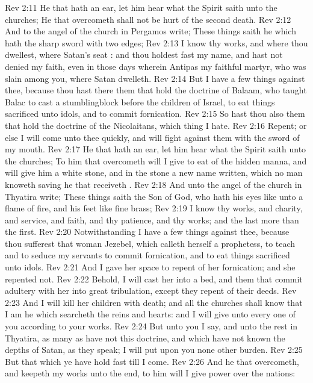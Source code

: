 \vs Rev 2:11 He that hath an ear, let him hear what the Spirit saith unto the churches; He that overcometh shall not be hurt of the second death.
\vs Rev 2:12 And to the angel of the church in Pergamos write; These things saith he which hath the sharp sword with two edges;
\vs Rev 2:13 I know thy works, and where thou dwellest,  where Satan's seat : and thou holdest fast my name, and hast not denied my faith, even in those days wherein Antipas  my faithful martyr, who was slain among you, where Satan dwelleth.
\vs Rev 2:14 But I have a few things against thee, because thou hast there them that hold the doctrine of Balaam, who taught Balac to cast a stumblingblock before the children of Israel, to eat things sacrificed unto idols, and to commit fornication.
\vs Rev 2:15 So hast thou also them that hold the doctrine of the Nicolaitans, which thing I hate.
\vs Rev 2:16 Repent; or else I will come unto thee quickly, and will fight against them with the sword of my mouth.
\vs Rev 2:17 He that hath an ear, let him hear what the Spirit saith unto the churches; To him that overcometh will I give to eat of the hidden manna, and will give him a white stone, and in the stone a new name written, which no man knoweth saving he that receiveth .
\vs Rev 2:18 And unto the angel of the church in Thyatira write; These things saith the Son of God, who hath his eyes like unto a flame of fire, and his feet  like fine brass;
\vs Rev 2:19 I know thy works, and charity, and service, and faith, and thy patience, and thy works; and the last  more than the first.
\vs Rev 2:20 Notwithstanding I have a few things against thee, because thou sufferest that woman Jezebel, which calleth herself a prophetess, to teach and to seduce my servants to commit fornication, and to eat things sacrificed unto idols.
\vs Rev 2:21 And I gave her space to repent of her fornication; and she repented not.
\vs Rev 2:22 Behold, I will cast her into a bed, and them that commit adultery with her into great tribulation, except they repent of their deeds.
\vs Rev 2:23 And I will kill her children with death; and all the churches shall know that I am he which searcheth the reins and hearts: and I will give unto every one of you according to your works.
\vs Rev 2:24 But unto you I say, and unto the rest in Thyatira, as many as have not this doctrine, and which have not known the depths of Satan, as they speak; I will put upon you none other burden.
\vs Rev 2:25 But that which ye have  hold fast till I come.
\vs Rev 2:26 And he that overcometh, and keepeth my works unto the end, to him will I give power over the nations:
